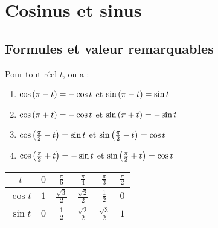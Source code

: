 \section{Cosinus et sinus}
\subsection{Formules et valeur remarquables}

\begin{formu}
	Pour tout réel \(t\), on a :
	\begin{enumerate}
		\item \( \cos\left(\pi - t\right) = -\cos t \) et \( \sin\left(\pi - t\right) = \sin t \) \\
		\item \( \cos\left(\pi + t\right) = -\cos t \) et \( \sin\left(\pi + t\right) = -\sin t \) \\
		\item \( \cos\left(\frac{\pi}{2} - t\right) = \sin t \) et \( \sin\left(\frac{\pi}{2} - t\right) = \cos t \) \\
		\item \( \cos\left(\frac{\pi}{2} + t\right) = -\sin t \) et \( \sin\left(\frac{\pi}{2} + t\right) = \cos t \) \\
	\end{enumerate}
    \renewcommand{\arraystretch}{2.75}
	\begin{tabular}{|c|c|c|c|c|c|}

		\hline
		\(t\)       & \(0\) & \(\frac{\pi}{6}\)      & \(\frac{\pi}{4}\)      & \(\frac{\pi}{3}\)       & \(\frac{\pi}{2}\) \\
		\hline
		\(\cos t \) & \(1\) & \(\frac{\sqrt{3}}{2}\) & \(\frac{\sqrt{2}}{2}\) & \(\frac{1}{2}\)        & \(0\)             \\
		\hline
		\(\sin t \) & \(0\) & \(\frac{1}{2}\)        & \(\frac{\sqrt{2}}{2}\) & \(\frac{\sqrt{3}}{2}\) & \(1\)             \\
		\hline
	\end{tabular}
\end{formu}

